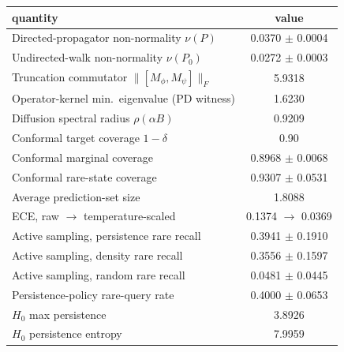 \begin{tabular}{lc}
\toprule
quantity & value \\
\midrule
Directed-propagator non-normality $\nu(P)$ & 0.0370 $\pm$ 0.0004 \\
Undirected-walk non-normality $\nu(P_0)$ & 0.0272 $\pm$ 0.0003 \\
Truncation commutator $\|[M_\phi,M_\psi]\|_F$ & 5.9318 \\
Operator-kernel min.\ eigenvalue (PD witness) & 1.6230 \\
Diffusion spectral radius $\rho(\alpha B)$ & 0.9209 \\
\midrule
Conformal target coverage $1-\delta$ & 0.90 \\
Conformal marginal coverage & 0.8968 $\pm$ 0.0068 \\
Conformal rare-state coverage & 0.9307 $\pm$ 0.0531 \\
Average prediction-set size & 1.8088 \\
ECE, raw $\to$ temperature-scaled & 0.1374 $\to$ 0.0369 \\
\midrule
Active sampling, persistence rare recall & 0.3941 $\pm$ 0.1910 \\
Active sampling, density rare recall & 0.3556 $\pm$ 0.1597 \\
Active sampling, random rare recall & 0.0481 $\pm$ 0.0445 \\
Persistence-policy rare-query rate & 0.4000 $\pm$ 0.0653 \\
\midrule
$H_0$ max persistence & 3.8926 \\
$H_0$ persistence entropy & 7.9959 \\
\bottomrule
\end{tabular}
